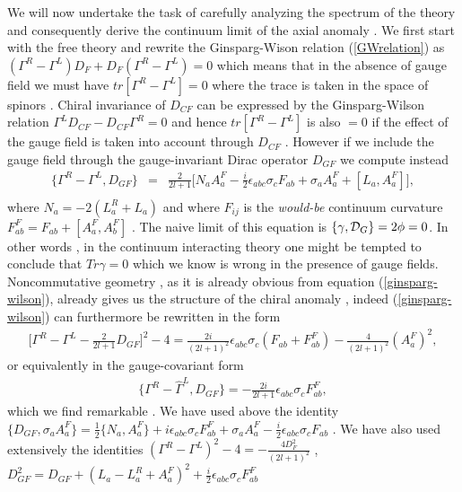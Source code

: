 \documentclass[a4paper,10pt]{article}
\begin{document}
We will now undertake the task of carefully analyzing the
spectrum of the theory and consequently derive the continuum
limit of the axial anomaly . We first start with the free theory
and rewrite the Ginsparg-Wison relation (\ref{GWrelation}) as $
({\Gamma}^R-{\Gamma}^L)D_F+D_F({\Gamma}^R-{\Gamma}^L)=0$ which
means that in the absence of gauge field we must have $
tr[{\Gamma}^R-{\Gamma}^L]=0$ where the trace is taken in the space
of spinors . Chiral invariance of $D_{CF}$ can be expressed by the
Ginsparg-Wilson relation ${\Gamma}^LD_{CF}-D_{CF}{\Gamma}^R=0$
and hence $tr[{\Gamma}^R-{\Gamma}^L]$ is also $=0$ if the effect
of the gauge field is taken into account through $D_{CF}$ .
However if we include the gauge field through the gauge-invariant
Dirac operator $D_{GF}$ we compute instead
\begin{eqnarray}
\{{\Gamma}^R-{\Gamma}^L,D_{GF}\}&=&\frac{2}{2l+1}\bigg[N_aA_a^F-\frac{i}{2}{\epsilon}_{abc}{\sigma}_cF_{ab}+{\sigma}_a{A}^F_a
+[L_a,A_a^F]\bigg], \label{ginsparg-wilson}\nonumber\\
\end{eqnarray}
where $N_a=-2(L_a^R+L_a)$ and where $F_{ij}$ is the {\it
would-be} continuum curvature $F_{ab}^F=F_{ab}+[A_a^F,A_b^F]$ .
The naive limit of this equation is $\{{\gamma},{\cal
D}_G\}=2{\phi}=0$. In other words , in the continuum interacting
theory one might be tempted to conclude that $Tr{\gamma}=0$ which
we know is wrong in the presence of gauge fields. Noncommutative
geometry , as it is already obvious from equation
(\ref{ginsparg-wilson}), already gives us the structure of  the
chiral anomaly , indeed (\ref{ginsparg-wilson}) can furthermore be
rewritten in the form
\begin{eqnarray}
\big[{\Gamma}^R-{\Gamma}^L-\frac{2}{2l+1}D_{GF}\big]^2-4=\frac{2i}{(2l+1)^2}{\epsilon}_{abc}{\sigma}_c(F_{ab}+F_{ab}^F)-\frac{4}{(2l+1)^2}({A}_a^{F})^2,\nonumber
\end{eqnarray}
or equivalently in the gauge-covariant form
\begin{eqnarray}
\{{\Gamma}^R-\hat{\Gamma}^L,D_{GF}\}=-\frac{2i}{2l+1}{\epsilon}_{abc}{\sigma}_cF_{ab}^F,
\end{eqnarray}
which we find remarkable . We have used above the identity $\{D_{GF},{\sigma}_aA_a^F\}=\frac{1}{2}\{N_a,A_a^F\}+i{\epsilon}_{abc}{\sigma}_cF_{ab}^F+{\sigma}_aA_a^F-\frac{i}{2}{\epsilon}_{abc}{\sigma}_cF_{ab}$ . We have also used extensively the identities
$({\Gamma}^R-{\Gamma}^L)^2-4=-\frac{4D^2_F}{(2l+1)^2}$ ,
$D_{GF}^2=D_{GF}+({
L}_a-L_a^R+{A}_a^F)^2+\frac{i}{2}{\epsilon}_{abc}{\sigma}_cF_{ab}^F$
\end{document}
